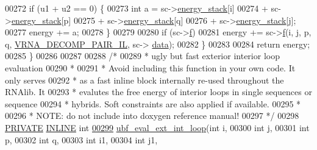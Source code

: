 \begin{DoxyCode}
00272       \textcolor{keywordflow}{if} (u1 + u2 == 0) \{
00273         \textcolor{keywordtype}{int} a = sc->\mbox{\hyperlink{group__soft__constraints_ac20dded6068e81acd0f1139092f66a22}{energy\_stack}}[i]
00274                 + sc->\mbox{\hyperlink{group__soft__constraints_ac20dded6068e81acd0f1139092f66a22}{energy\_stack}}[p]
00275                 + sc->\mbox{\hyperlink{group__soft__constraints_ac20dded6068e81acd0f1139092f66a22}{energy\_stack}}[q]
00276                 + sc->\mbox{\hyperlink{group__soft__constraints_ac20dded6068e81acd0f1139092f66a22}{energy\_stack}}[j];
00277         energy += a;
00278       \}
00279 
00280     \textcolor{keywordflow}{if} (sc->\mbox{\hyperlink{group__soft__constraints_a32dc86090237888c75491bbd4861a04b}{f}})
00281       energy += sc->\mbox{\hyperlink{group__soft__constraints_a32dc86090237888c75491bbd4861a04b}{f}}(i, j, p, q, \mbox{\hyperlink{group__constraints_gaeab04f34d7730cff2d651d782f95d857}{VRNA\_DECOMP\_PAIR\_IL}}, sc->
      \mbox{\hyperlink{group__soft__constraints_a7574680143df97b9029146c2150bf06d}{data}});
00282   \}
00283 
00284   \textcolor{keywordflow}{return} energy;
00285 \}
00286 
00287 
00288 \textcolor{comment}{/*}
00289 \textcolor{comment}{ *  ugly but fast exterior interior loop evaluation}
00290 \textcolor{comment}{ *}
00291 \textcolor{comment}{ *  Avoid including this function in your own code. It only serves}
00292 \textcolor{comment}{ *  as a fast inline block internally re-used throughout the RNAlib. It}
00293 \textcolor{comment}{ *  evalutes the free energy of interior loops in single sequences or sequence}
00294 \textcolor{comment}{ *  hybrids. Soft constraints are also applied if available.}
00295 \textcolor{comment}{ *}
00296 \textcolor{comment}{ *  NOTE: do not include into doxygen reference manual!}
00297 \textcolor{comment}{ */}
00298 \mbox{\hyperlink{edit__cost_8h_a5e151c615eda34903514212f05a5ccf8}{PRIVATE}} \mbox{\hyperlink{interior__loops_8h_a2eb6f9e0395b47b8d5e3eeae4fe0c116}{INLINE}} \textcolor{keywordtype}{int}
\mbox{\hyperlink{group__loops_ga0f0ba96735be7e218bed5db4746012fd}{00299}} \mbox{\hyperlink{group__loops_ga0f0ba96735be7e218bed5db4746012fd}{ubf\_eval\_ext\_int\_loop}}(\textcolor{keywordtype}{int}           i,
00300                       \textcolor{keywordtype}{int}           j,
00301                       \textcolor{keywordtype}{int}           p,
00302                       \textcolor{keywordtype}{int}           q,
00303                       \textcolor{keywordtype}{int}           i1,
00304                       \textcolor{keywordtype}{int}           j1,

\end{DoxyCode}
